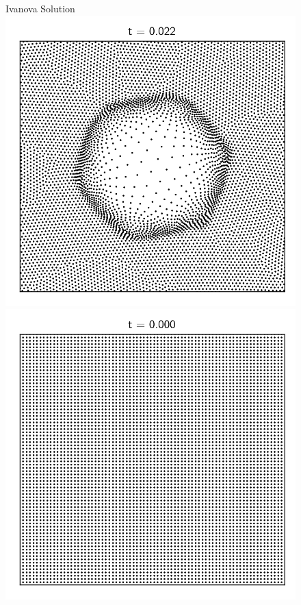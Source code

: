 \begin{figure}
\endminipage\hfill
{}%
	\centering
	Ivanova Solution
  \includegraphics[width=\linewidth]{figures/Meshless/positions_sedov_ivanova_glass.png}
\endminipage\\
%
%
  \includegraphics[width=\linewidth]{figures/Meshless/positions_sedov_uniform_IC.png}

\end{figure}
